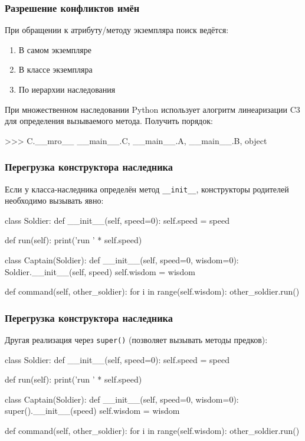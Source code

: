\documentclass[fleqn, xcolor=x11names, 11pt]{beamer}
\begin{document}
\begin{frame}[fragile]\frametitle{Разрешение конфликтов имён}

При обращении к атрибуту/методу экземпляра поиск ведётся:

\begin{enumerate}
\item В самом экземпляре
\item В классе экземпляра
\item По иерархии наследования
\end{enumerate}

\hfill

При множественном наследовании Python использует алогритм линеаризации C3 для определения вызываемого метода. Получить порядок:
\begin{pcode}
>>> C.__mro__
__main__.C, __main__.A, __main__.B, object
\end{pcode}

\end{frame}

\begin{frame}[fragile]\frametitle{Перегрузка конструктора наследника}
Если у класса-наследника определён метод \texttt{__init__}, конструкторы родителей необходимо вызывать явно:

\begin{pcode}
class Soldier:
    def __init__(self, speed=0):
        self.speed = speed
    
    def run(self):
        print('run ' * self.speed)
            
class Captain(Soldier):
    def __init__(self, speed=0, wisdom=0):
        Soldier.__init__(self, speed)
        self.wisdom = wisdom
        
    def command(self, other_soldier):
        for i in range(self.wisdom):
            other_soldier.run()
\end{pcode}

\end{frame}

\begin{frame}[fragile]\frametitle{Перегрузка конструктора наследника}
Другая реализация через  \texttt{super()}
(позволяет вызывать методы предков):
\begin{pcode}
class Soldier:
    def __init__(self, speed=0):
        self.speed = speed
    
    def run(self):
        print('run ' * self.speed)
            
class Captain(Soldier):
    def __init__(self, speed=0, wisdom=0):
        super().__init__(speed)
        self.wisdom = wisdom
        
    def command(self, other_soldier):
        for i in range(self.wisdom):
            other_soldier.run()
\end{pcode}

\end{frame}
\end{document}
